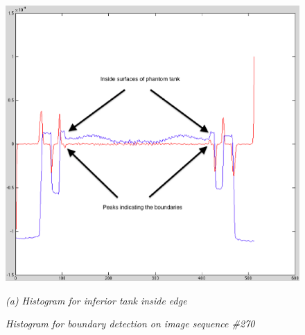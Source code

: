 \begin{figure}[htb]
  \begin{minipage}[t]{5in}
    \centering
    \centerline{\mbox{\includegraphics[width=5in]{data_extraction/images/sample/20121017_270/Coronal/inferior_inside/histogram_marked.eps}}}
    \centerline{\emph{(a) Histogram for inferior tank inside edge}}
  \end{minipage}
  \caption{\emph{Histogram for boundary detection on image sequence \#270}}
  \label{fig:coronal_270_boundary_histogram}
\end{figure}


